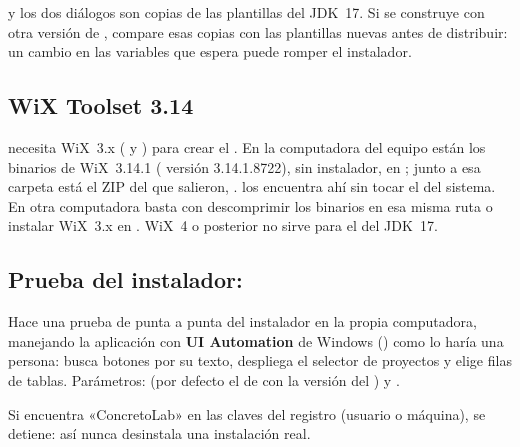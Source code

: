 \begin{advertencia}
 y los dos diálogos son copias de las plantillas del JDK~17. Si se construye con otra versión de
, compare esas copias con las plantillas nuevas antes de distribuir: un cambio en las variables que
 espera puede romper el instalador.
\end{advertencia}

\subsection{WiX Toolset 3.14}

 necesita WiX~3.x ( y ) para crear el . En la computadora
del equipo están los binarios de WiX~3.14.1 ( versión 3.14.1.8722), sin instalador, en
; junto a esa carpeta está el ZIP
del que salieron, .  los encuentra ahí sin tocar el
 del sistema. En otra computadora basta con descomprimir los binarios en esa misma ruta o instalar WiX~3.x
en . WiX~4 o posterior no sirve para el  del JDK~17.

\subsection{Prueba del instalador: }

Hace una prueba de punta a punta del instalador en la propia computadora, manejando la aplicación con
\textbf{UI Automation} de Windows () como lo haría una persona: busca botones por su
texto, despliega el selector de proyectos y elige filas de tablas. Parámetros:  (por defecto el
 de  con la versión del ) y .

\begin{importante}
Si encuentra «ConcretoLab» en las claves  del registro (usuario o máquina), se detiene: así nunca
desinstala una instalación real.
\end{importante}

